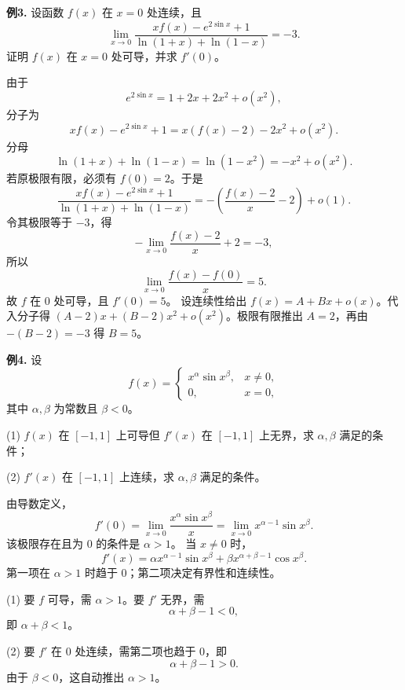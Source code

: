 \begin{problemblock}
\textbf{例3.} 设函数 \(f(x)\) 在 \(x=0\) 处连续，且
\[
\lim_{x\to0}\frac{x f(x)-e^{2\sin x}+1}{\ln(1+x)+\ln(1-x)}=-3.
\]
证明 \(f(x)\) 在 \(x=0\) 处可导，并求 \(f'(0)\)。
\end{problemblock}
\begin{solutionblock}
由于
\[
e^{2\sin x}=1+2x+2x^2+o(x^2),
\]
分子为
\[
x f(x)-e^{2\sin x}+1=x(f(x)-2)-2x^2+o(x^2).
\]
分母
\[
\ln(1+x)+\ln(1-x)=\ln(1-x^2)=-x^2+o(x^2).
\]
若原极限有限，必须有 \(f(0)=2\)。于是
\[
\frac{x f(x)-e^{2\sin x}+1}{\ln(1+x)+\ln(1-x)}
= -\left(\frac{f(x)-2}{x}-2\right)+o(1).
\]
令其极限等于 \(-3\)，得
\[
-\lim_{x\to0}\frac{f(x)-2}{x}+2=-3,
\]
所以
\[
\lim_{x\to0}\frac{f(x)-f(0)}x=5.
\]
故 \(f\) 在 0 处可导，且 \(f'(0)=5\)。
设连续性给出 \(f(x)=A+Bx+o(x)\)。代入分子得 \((A-2)x+(B-2)x^2+o(x^2)\)。极限有限推出 \(A=2\)，再由 \(-(B-2)=-3\) 得 \(B=5\)。
\end{solutionblock}

\begin{problemblock}
\textbf{例4.} 设
\[
f(x)=\begin{cases}
x^\alpha\sin x^\beta,&x\ne0,\\
0,&x=0,
\end{cases}
\]
其中 \(\alpha,\beta\) 为常数且 \(\beta<0\)。

(1) \(f(x)\) 在 \([-1,1]\) 上可导但 \(f'(x)\) 在 \([-1,1]\) 上无界，求 \(\alpha,\beta\) 满足的条件；

(2) \(f'(x)\) 在 \([-1,1]\) 上连续，求 \(\alpha,\beta\) 满足的条件。
\end{problemblock}
\begin{solutionblock}
由导数定义，
\[
f'(0)=\lim_{x\to0}\frac{x^\alpha\sin x^\beta}{x}
=\lim_{x\to0}x^{\alpha-1}\sin x^\beta.
\]
该极限存在且为 0 的条件是 \(\alpha>1\)。
当 \(x\ne0\) 时，
\[
f'(x)=\alpha x^{\alpha-1}\sin x^\beta+\beta x^{\alpha+\beta-1}\cos x^\beta.
\]
第一项在 \(\alpha>1\) 时趋于 0；第二项决定有界性和连续性。

(1) 要 \(f\) 可导，需 \(\alpha>1\)。要 \(f'\) 无界，需
\[
\alpha+\beta-1<0,
\]
即 \(\alpha+\beta<1\)。

(2) 要 \(f'\) 在 0 处连续，需第二项也趋于 0，即
\[
\alpha+\beta-1>0.
\]
由于 \(\beta<0\)，这自动推出 \(\alpha>1\)。
\end{solutionblock}

